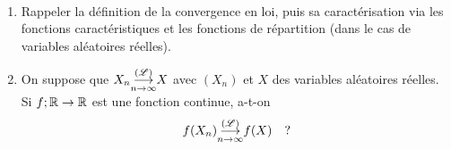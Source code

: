 \begin{td-exo}[]\,
    \begin{enumerate}
        \item Rappeler la définition de la convergence en loi,
        puis sa caractérisation via les fonctions caractéristiques
        et les fonctions de répartition (dans le cas de variables
        aléatoires réelles).

        \item On suppose que \(X_n\underset{n\to\infty}{{\overset{(\mathscr{L})}{\longrightarrow}}} X\) avec \((X_n)\) et \(X\)
        des variables aléatoires réelles. Si \(f;\mathbb{R}\to\mathbb{R}\) est
        une fonction continue, a-t-on
        \begin{equation*}
            f(X_n)\underset{n\to\infty}{{\overset{(\mathscr{L})}{\longrightarrow}}} f(X)\quad\text{?}
        \end{equation*}
    \end{enumerate}
\end{td-exo}


